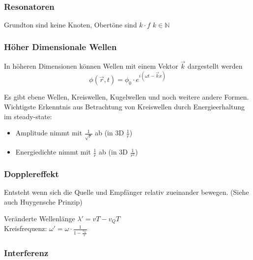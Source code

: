 \documentclass[a4paper,12pt]{report}
\begin{document}
\subsubsection{Resonatoren}

Grundton sind keine Knoten, Obertöne sind $ k \cdot f $ \quad  $ k  \in \mathbb{N} $ \\

\subsubsection{Höher Dimensionale Wellen}

In höheren Dimensionen können Wellen mit einem Vektor $\vec{k}$ dargestellt werden \\ 

\begin{equation*}
\phi(\vec{r}, t) = \phi_0 \cdot e^{i(\omega t - \vec{k} x)} 
\end{equation*}

Es gibt ebene Wellen, Kreiswellen, Kugelwellen und noch weitere andere Formen. Wichtigste Erkenntnis aus Betrachtung von Kreiswellen durch Energieerhaltung im steady-state: \\

\begin{itemize}
\item Amplitude nimmt mit $\frac{1}{\sqrt{r}}$ ab (in 3D $\frac{1}{r}$)
\item Energiedichte nimmt mit $\frac{1}{r}$ ab (in 3D $\frac{1}{r^2}$)
\end{itemize}


\subsubsection{Dopplereffekt}

Entsteht wenn sich die Quelle und Empfänger relativ zueinander bewegen. (Siehe auch Huygensche Prinzip)

Veränderte Wellenlänge $ \lambda' = vT-v_QT $ \\

Kreisfrequenz: $\omega' = \omega \cdot \frac{1}{1- \frac{v_Q}{v}} $ \\




\subsubsection{Interferenz}
\end{document}
